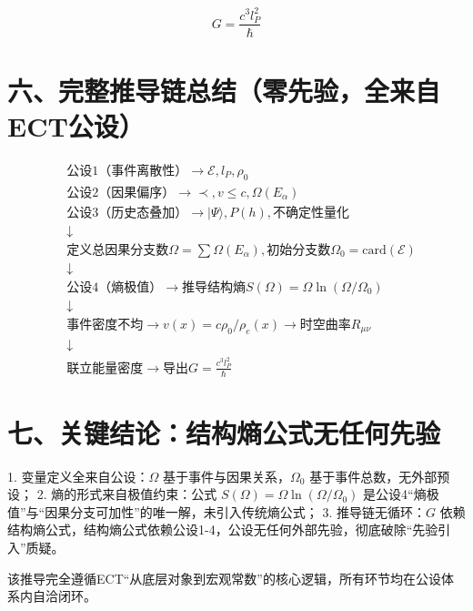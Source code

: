 \documentclass{article}
\begin{document}
\[
\boxed{G = \frac{c^3 l_P^2}{\hbar}}
\]

\section*{六、完整推导链总结（零先验，全来自ECT公设）}

\[
\begin{aligned}
&\text{公设1（事件离散性）} \to \mathcal{E}, l_P, \rho_0 \\
&\text{公设2（因果偏序）} \to \prec, v \leq c, \Omega(E_\alpha) \\
&\text{公设3（历史态叠加）} \to |\Psi\rangle, P(h), \text{不确定性量化} \\
&\downarrow \\
&\text{定义总因果分支数} \Omega = \sum \Omega(E_\alpha), \text{初始分支数} \Omega_0 = \text{card}(\mathcal{E}) \\
&\downarrow \\
&\text{公设4（熵极值）} \to \text{推导结构熵} S(\Omega) = \Omega \ln(\Omega/\Omega_0) \\
&\downarrow \\
&\text{事件密度不均} \to v(x) = c \rho_0/\rho_e(x) \to \text{时空曲率} R_{\mu\nu} \\
&\downarrow \\
&\text{联立能量密度} \to \text{导出} G = \frac{c^3 l_P^2}{\hbar}
\end{aligned}
\]

\section*{七、关键结论：结构熵公式无任何先验}

1. 变量定义全来自公设：\( \Omega \) 基于事件与因果关系，\( \Omega_0 \) 基于事件总数，无外部预设；
2. 熵的形式来自极值约束：公式 \( S(\Omega) = \Omega \ln(\Omega/\Omega_0) \) 是公设4“熵极值”与“因果分支可加性”的唯一解，未引入传统熵公式；
3. 推导链无循环：\( G \) 依赖结构熵公式，结构熵公式依赖公设1-4，公设无任何外部先验，彻底破除“先验引入”质疑。

该推导完全遵循ECT“从底层对象到宏观常数”的核心逻辑，所有环节均在公设体系内自洽闭环。
\end{document}
